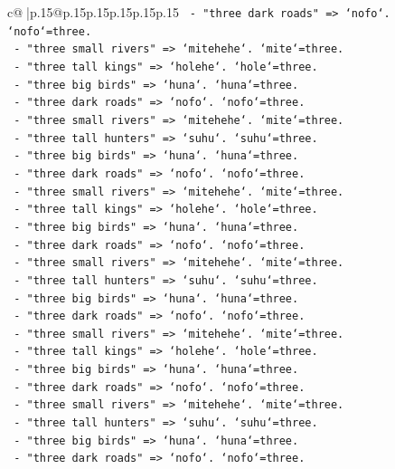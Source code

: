 \documentclass{article}
\begin{document}
{\begin{supertabular}{c@{$\;$}|p{.15\linewidth}@{}p{.15\linewidth}p{.15\linewidth}p{.15\linewidth}p{.15\linewidth}p{.15\linewidth}}
{{{\texttt{      {-} "three dark roads" => `nofo`. `nofo`=three.} \\
\texttt{      {-} "three small rivers" => `mitehehe`. `mite`=three.} \\
\texttt{      {-} "three tall kings" => `holehe`. `hole`=three.} \\
\texttt{      {-} "three big birds" => `huna`. `huna`=three.} \\
\texttt{      {-} "three dark roads" => `nofo`. `nofo`=three.} \\
\texttt{      {-} "three small rivers" => `mitehehe`. `mite`=three.} \\
\texttt{      {-} "three tall hunters" => `suhu`. `suhu`=three.} \\
\texttt{      {-} "three big birds" => `huna`. `huna`=three.} \\
\texttt{      {-} "three dark roads" => `nofo`. `nofo`=three.} \\
\texttt{      {-} "three small rivers" => `mitehehe`. `mite`=three.} \\
\texttt{      {-} "three tall kings" => `holehe`. `hole`=three.} \\
\texttt{      {-} "three big birds" => `huna`. `huna`=three.} \\
\texttt{      {-} "three dark roads" => `nofo`. `nofo`=three.} \\
\texttt{      {-} "three small rivers" => `mitehehe`. `mite`=three.} \\
\texttt{      {-} "three tall hunters" => `suhu`. `suhu`=three.} \\
\texttt{      {-} "three big birds" => `huna`. `huna`=three.} \\
\texttt{      {-} "three dark roads" => `nofo`. `nofo`=three.} \\
\texttt{      {-} "three small rivers" => `mitehehe`. `mite`=three.} \\
\texttt{      {-} "three tall kings" => `holehe`. `hole`=three.} \\
\texttt{      {-} "three big birds" => `huna`. `huna`=three.} \\
\texttt{      {-} "three dark roads" => `nofo`. `nofo`=three.} \\
\texttt{      {-} "three small rivers" => `mitehehe`. `mite`=three.} \\
\texttt{      {-} "three tall hunters" => `suhu`. `suhu`=three.} \\
\texttt{      {-} "three big birds" => `huna`. `huna`=three.} \\
\texttt{      {-} "three dark roads" => `nofo`. `nofo`=three.} \\
}}}
\end{supertabular}}
\end{document}
